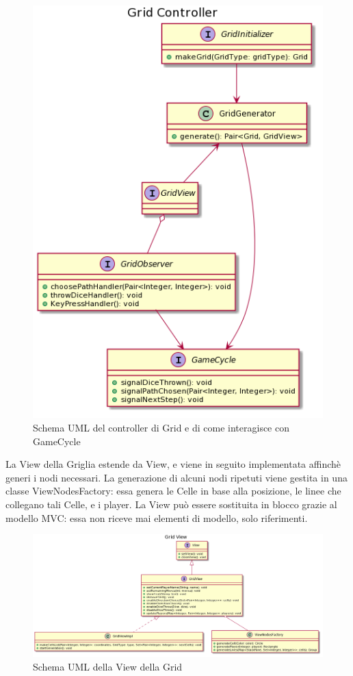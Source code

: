 \documentclass[a4paper,12pt]{report}
\begin{document}
\begin{figure}[h]
\centering{}
\includegraphics[width=\textwidth]{images/miriana/grid_controller.png}
\caption{Schema UML del controller di Grid e di come interagisce con GameCycle}
\label{img:gridcontroller}
\end{figure}

La View della Griglia estende da View, e viene in seguito implementata affinchè generi i nodi necessari.
%
La generazione di alcuni nodi ripetuti viene gestita in una classe ViewNodesFactory: essa genera le Celle in base alla posizione, le linee che collegano tali Celle, e i player.
%
La View può essere sostituita in blocco grazie al modello MVC: essa non riceve mai elementi di modello, solo riferimenti.

\begin{figure}[h]
	\centering{}
	\includegraphics[width=\textwidth]{images/miriana/grid_view.png}
	\caption{Schema UML della View della Grid}
	\label{img:gridview}
\end{figure}
\end{document}
